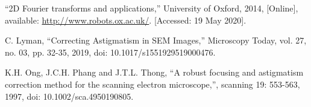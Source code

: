 \documentclass[12pt, twocolumn]{report}
\begin{document}
\begin{thebibliography}{00}
    ``2D Fourier transforms and applications,'' University of Oxford, 2014, [Online], available: \url{http://www.robots.ox.ac.uk/}. [Accessed: 19 May 2020].

    C. Lyman, ``Correcting Astigmatism in SEM Images,'' Microscopy Today, vol. 27, no. 03, pp. 32-35, 2019, doi: 10.1017/s1551929519000476.

    K.H. Ong, J.C.H. Phang and J.T.L. Thong, ``A robust focusing and astigmatism correction method for the scanning electron microscope,'', scanning 19: 553-563, 1997, doi: 10.1002/sca.4950190805.
\end{thebibliography}
\end{document}
